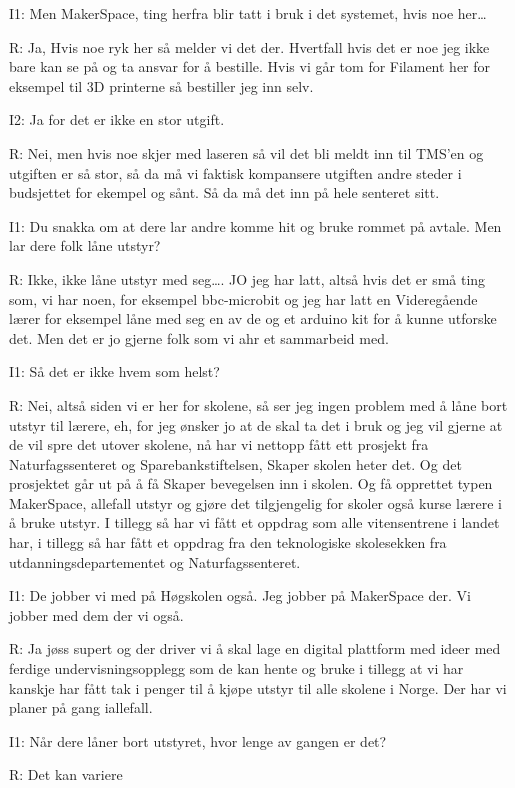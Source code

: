 I1: Men MakerSpace, ting herfra blir tatt i bruk i det systemet, hvis noe her…

R: Ja,  Hvis noe ryk her så  melder vi det der. Hvertfall hvis det er noe jeg ikke bare kan se på og ta ansvar for å bestille. Hvis vi går tom for Filament her for eksempel  til 3D printerne så bestiller jeg inn selv.       

I2: Ja for det er ikke en stor utgift.

R: Nei, men hvis noe skjer med laseren så vil det bli meldt inn til TMS’en og utgiften er så stor, så da må vi faktisk kompansere utgiften andre steder i budsjettet for ekempel og sånt. Så da må det inn på hele senteret sitt.

I1: Du snakka om at dere lar andre komme hit og bruke rommet på avtale. Men lar dere folk låne utstyr?   

R: Ikke, ikke låne utstyr med seg…. JO jeg har latt, altså hvis det er små ting som, vi har noen, for eksempel bbc-microbit og jeg har latt en Videregående lærer for eksempel låne med seg en av de og et arduino kit for å kunne utforske det. Men det er jo gjerne folk som vi ahr et sammarbeid med.  

I1: Så det er ikke hvem som helst?

R: Nei, altså siden vi er her for skolene, så  ser jeg ingen problem med å låne bort utstyr til lærere, eh, for jeg ønsker jo at de skal ta det i bruk og jeg vil gjerne at de vil spre det utover skolene, nå har vi nettopp fått ett prosjekt fra Naturfagssenteret og  Sparebankstiftelsen, Skaper skolen heter det.  Og det prosjektet går ut på å få  Skaper bevegelsen inn i skolen. Og få opprettet typen MakerSpace, allefall utstyr og gjøre det tilgjengelig for skoler også kurse lærere i å bruke utstyr. I tillegg så har vi fått et oppdrag som alle vitensentrene i landet har, i tillegg så har fått et oppdrag fra den teknologiske skolesekken  fra utdanningsdepartementet og Naturfagssenteret.     

I1: De jobber vi med på Høgskolen også. Jeg jobber på MakerSpace der. Vi jobber med dem der vi også.

R: Ja jøss supert og der driver vi å skal lage en digital plattform med ideer med ferdige undervisningsopplegg  som de kan hente og bruke i tillegg at vi har kanskje har fått tak i penger til å kjøpe utstyr til alle skolene i Norge. Der har vi planer på gang iallefall. 

I1: Når dere låner bort utstyret, hvor lenge av gangen er det? 

R: Det kan variere

